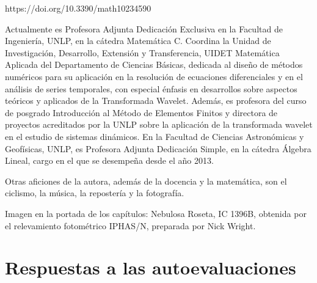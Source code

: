 \documentclass[a4paper,12pt,twopage]{book}
\begin{document}
\begin{parchment}
{\begin{itemize}
https://doi.org/10.3390/math10234590

\end{itemize}

\bigskip


Actualmente es Profesora Adjunta Dedicación Exclusiva en la Facultad de Ingeniería, UNLP, en la cátedra Matemática C. Coordina la Unidad de Investigación, Desarrollo, Extensión y Transferencia, UIDET Matemática Aplicada del Departamento de Ciencias Básicas,  dedicada al diseño de métodos numéricos para su aplicación en la resolución de ecuaciones diferenciales y en el análisis de series temporales, con especial énfasis en desarrollos sobre aspectos teóricos y aplicados de la Transformada Wavelet. Además, es profesora del curso de posgrado Introducción al Método de Elementos Finitos y directora de proyectos acreditados por la UNLP sobre la aplicación de la transformada wavelet en el estudio de sistemas dinámicos.  
En la Facultad de Ciencias Astronómicas y Geofísicas, UNLP, es Profesora Adjunta Dedicación Simple, en la cátedra Álgebra Lineal, cargo en el que se  desempeña  desde el año 2013.


Otras aficiones de la autora, además de la docencia y la matemática, son el ciclismo, la música, la repostería y la fotografía.}
\end{parchment}


\newpage




Imagen en la portada de los capítulos: Nebulosa Roseta, IC 1396B, obtenida por el relevamiento fotométrico IPHAS/N, preparada por  Nick Wright.



%
\renewcommand\bibname{Referencias}

%

\chapter*{Respuestas a las autoevaluaciones}
\end{document}
